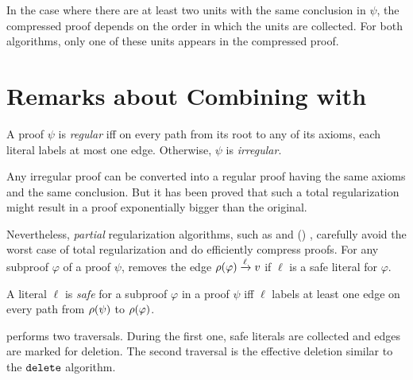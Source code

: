 \documentclass{llncs}
\begin{document}
In the case where there are at least two units with the same conclusion in $\psi$, the
compressed proof depends on the order in which the units are collected. For both algorithms, only one of these units appears in the compressed proof.



\section{Remarks about Combining {\LowerUnivalents} with {\RPI}} \label{sec:LUnivRPI}

\begin{definition}
A proof $\psi$ is \emph{regular} iff on every path from its root to any of its axioms, each literal
labels at most one edge. Otherwise, $\psi$ is \emph{irregular}.
\end{definition}

Any irregular proof can be converted into a regular proof having the same axioms and the same
conclusion. But it has been proved \cite{Goerdt} that such a total regularization might result in a
proof exponentially bigger than the original. 

Nevertheless, \emph{partial} regularization algorithms, such as {\RecyclePivots} \cite{RP08} and {\RecyclePivotsIntersection} ({\RPI}) \cite{LURPI}, carefully avoid the worst case of total regularization and do efficiently compress proofs.  For
any subproof $\varphi$ of a proof $\psi$, {\RPI} removes the edge $\rho(\varphi) \xrightarrow{\ell}
v$ if $\ell$ is a safe literal for $\varphi$.

\begin{definition}
A literal $\ell$ is \emph{safe} for a subproof $\varphi$ in a proof $\psi$ iff $\ell$ labels at
least one edge on every path from $\rho(\psi)$ to $\rho(\varphi)$.
\end{definition}

{\RPI} performs two traversals. During the first one, safe literals are collected and edges are
marked for deletion. The second traversal is the effective deletion similar to the
$\FuncSty{delete}$ algorithm.
\end{document}
